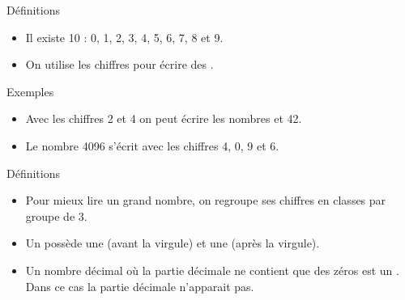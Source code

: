 \documentclass[xcolor={dvipsnames}]{beamer}
\begin{document}
\begin{frame}
	\begin{alertblock}{Définitions}
		\begin{itemize}\pause
			\item Il existe 10  : 0, 1, 2, 3, 4, 5, 6, 7, 8 et 9.\pause
			
			\item On utilise les chiffres pour écrire des .\pause	
		
		\end{itemize}
	\end{alertblock}

	\begin{exampleblock}{Exemples}
		\begin{itemize}
			\item Avec les chiffres 2 et 4 on peut écrire les nombres  et 42.\pause
			\item Le nombre \num{4096} s'écrit avec les chiffres 4, 0, 9 et 6.
			
		\end{itemize}
	\end{exampleblock}

	
\end{frame}



\begin{frame}
	\begin{alertblock}{Définitions}
		\begin{itemize}\pause
			\item Pour mieux lire un grand nombre, on regroupe ses chiffres en classes par groupe de 3.\pause
			
			\item Un  possède une  (avant la virgule) et une  (après la virgule).\pause
			
			\item Un nombre décimal où la partie décimale ne contient que des zéros est un . Dans ce cas la partie décimale n'apparait pas.	
			
		\end{itemize}
	\end{alertblock}	
	
\end{frame}
\end{document}
